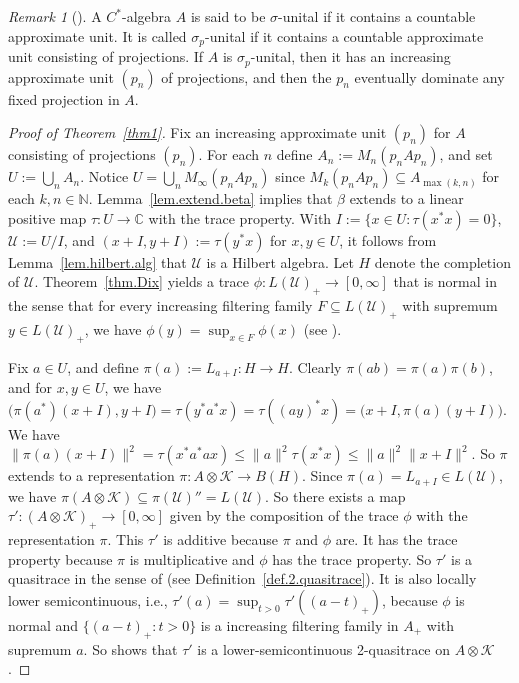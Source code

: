 \documentclass[a4paper, 12pt]{amsart}
\numberwithin{equation}{section}
\newcounter{theorem}
\theoremstyle{remark}
\newtheorem{remark}[theorem]{Remark}
\theoremstyle{definition}
\begin{document}
\begin{remark}[{\cite{MR2059808}}]\label{rem.rordam}
A $C^*$-algebra $A$ is said to be $\sigma$-unital if it contains a countable approximate
unit. It is  called $\sigma_p$-unital if it contains a countable approximate unit
consisting of  projections. If $A$ is $\sigma_p$-unital, then it has an increasing
approximate unit $(p_n)$ of projections, and then the $p_n$ eventually dominate any fixed
projection in $A$.
\end{remark}

\begin{proof}[Proof of Theorem~\ref{thm1}]
Fix an increasing approximate unit $(p_n)$ for $A$ consisting of projections $(p_n)$. For
each $n$ define $A_n:=M_n(p_nAp_n)$, and set $U:=\bigcup_nA_n$. Notice
$U=\bigcup_nM_\infty(p_nAp_n)$ since $M_k(p_nAp_n)\subseteq A_{\max(k,n)}$ for each
$k,n\in{\mathbb{N}}$. Lemma~\ref{lem.extend.beta} implies that $\beta$ extends to a linear
positive map $\tau\colon U\to {\mathbb{C}}$ with the trace property. With $I:=\{x\in U :
\tau(x^*x)=0\}$, ${\mathcal{U}}:=U/I$, and $(x+I,y+I):=\tau(y^*x)$ for $x,y\in U$, it follows from
Lemma~\ref{lem.hilbert.alg} that ${\mathcal{U}}$ is a Hilbert algebra. Let $H$ denote the
completion of ${\mathcal{U}}$. Theorem~\ref{thm.Dix} yields a trace $\phi : L({\mathcal{U}})_+ \to [0,\infty]$
that is normal in the
sense that for every increasing filtering family $F\subseteq L({\mathcal{U}})_+$ with supremum $y\in L({\mathcal{U}})_+$,
we have $\phi(y) = \sup_{x \in F} \phi(x)$ (see \cite[Definition 1, p.~56]{MR641217}).

Fix $a\in U$, and define $\pi(a) := L_{a + I} \colon H \to H$. Clearly $\pi(ab) =
\pi(a)\pi(b)$, and for $x,y \in U$, we have $\big(\pi(a^*) (x+I), y+I\big) = \tau(y^* a^*
x) = \tau((ay)^* x) = \big(x + I, \pi(a)(y+I)\big)$. We have $\|\pi(a) (x+I)\|^2 =
\tau(x^*a^*ax) \le\|a\|^2 \tau(x^*x) \le \|a\|^2 \|x + I\|^2$. So $\pi$ extends to a
representation $\pi\colon A\otimes {\mathcal{K}} \to B(H)$. Since $\pi(a) = L_{a + I} \in L({\mathcal{U}})$,
we have $\pi(A\otimes{\mathcal{K}}) \subseteq \pi({\mathcal{U}})'' = L({\mathcal{U}})$. So there exists a map
$\tau'\colon (A\otimes{\mathcal{K}})_+\to [0,\infty]$ given by the composition of the trace $\phi$
with the representation $\pi$. This $\tau'$ is additive because $\pi$ and $\phi$ are. It
has the trace property because $\pi$ is multiplicative and $\phi$ has the trace property.
So $\tau'$ is a quasitrace in the sense of \cite{MR2032998} (see
Definition~\ref{def.2.quasitrace}). It is also locally lower semicontinuous, i.e.,
$\tau'(a)= \sup_{t>0}\tau'((a-t)_+)$, because $\phi$ is normal and $\{(a-t)_+: t>0\}$ is a increasing filtering family in $A_+$ with supremum $a$.
So \cite[Proposition~2.24(i)--(iii)]{MR2032998} shows that $\tau'$ is a
lower-semicontinuous 2-quasitrace on $A\otimes {\mathcal{K}}$.


\end{proof}
\end{document}
